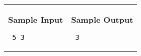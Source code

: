 \documentclass[11pt]{article}
\begin{document}
\vspace{0.25in}\hspace{-0.3in}\begin{tabular}{ll}

\parbox{3in}{{\large\bf Sample Input}

\vspace{0.15in}

{\tt 
5 3
}
}

&

\parbox{3in}{{\large\bf Sample Output}

\vspace{0.15in}

{\tt
3
}
}

\\
\end{tabular}
\end{document}
